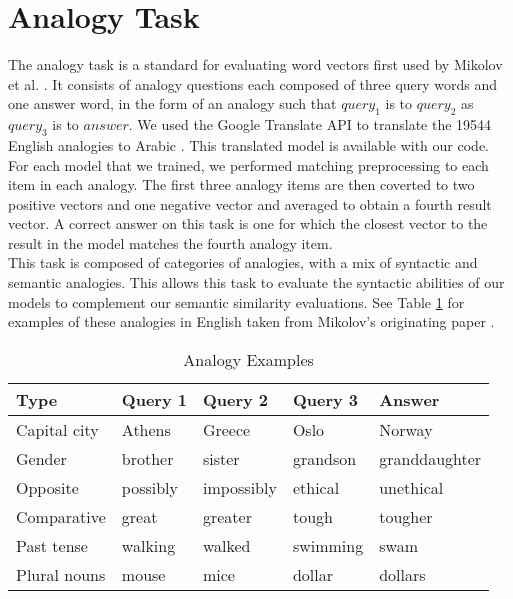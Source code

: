 \section{Analogy Task}

The analogy task is a standard for evaluating word vectors first used by Mikolov et al. \cite{mikoloveffic:2013}. It consists of analogy questions each composed of three query words and one answer word, in the form of an analogy such that $query_1$ is to $query_2$ as $query_3$ is to $answer$. We used the Google Translate API to translate the 19544 English analogies to Arabic \cite{google:online}. This translated model is available with our code. For each model that we trained, we performed matching preprocessing to each item in each analogy. The first three analogy items are then coverted to two positive vectors and one negative vector and averaged to obtain a fourth result vector. A correct answer on this task is one for which the closest vector to the result in the model matches the fourth analogy item.
\\
This task is composed of categories of analogies, with a mix of syntactic and semantic analogies. This allows this task to evaluate the syntactic abilities of our models to complement our semantic similarity evaluations. See Table \ref{table:analogyexamples} for examples of these analogies in English taken from Mikolov's originating paper \cite{mikoloveffic:2013}.

\begin{table}
\begin{center}

\begin{tabular}{l|l|l|l|l}
\textbf{Type} & \textbf{Query 1} & \textbf{Query 2} & \textbf{Query 3} & \textbf{Answer}\\
\hline
Capital city & Athens & Greece & Oslo & Norway \\
Gender & brother & sister & grandson & granddaughter \\
Opposite & possibly & impossibly & ethical & unethical \\
Comparative & great & greater &  tough & tougher \\
Past tense & walking & walked & swimming & swam \\
Plural nouns & mouse & mice & dollar & dollars \\
\end{tabular}
\caption{Analogy Examples}
\label{table:analogyexamples}
\end{center}
\end{table}



